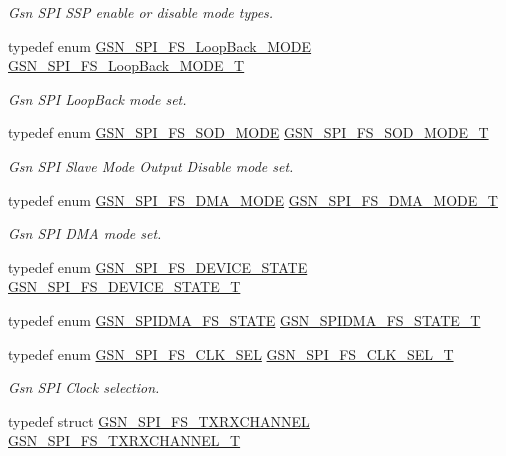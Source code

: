 \begin{DoxyCompactItemize}
\begin{DoxyCompactList}\small\item\em Gsn SPI SSP enable or disable mode types. \end{DoxyCompactList}\item 
typedef enum \hyperlink{a00655_ga082cec3b28f66e93faf6463fa1b76413}{GSN\_\-SPI\_\-FS\_\-LoopBack\_\-MODE} \hyperlink{a00655_ga721139ec14f269f577231293b4b96dad}{GSN\_\-SPI\_\-FS\_\-LoopBack\_\-MODE\_\-T}
\begin{DoxyCompactList}\small\item\em Gsn SPI LoopBack mode set. \end{DoxyCompactList}\item 
typedef enum \hyperlink{a00655_ga7fdf2844c62b8075aa8d730cc4e17134}{GSN\_\-SPI\_\-FS\_\-SOD\_\-MODE} \hyperlink{a00655_gaa0f62d38ee68880a4e3bb673a05d293d}{GSN\_\-SPI\_\-FS\_\-SOD\_\-MODE\_\-T}
\begin{DoxyCompactList}\small\item\em Gsn SPI Slave Mode Output Disable mode set. \end{DoxyCompactList}\item 
typedef enum \hyperlink{a00655_ga527bb8ce76fef8354e9db5ed16509e26}{GSN\_\-SPI\_\-FS\_\-DMA\_\-MODE} \hyperlink{a00655_ga1348552a2785bfc5647d4b4aa234c64c}{GSN\_\-SPI\_\-FS\_\-DMA\_\-MODE\_\-T}
\begin{DoxyCompactList}\small\item\em Gsn SPI DMA mode set. \end{DoxyCompactList}\item 
typedef enum \hyperlink{a00589_a0e734f119d784afd32b10d30c8cca2f6}{GSN\_\-SPI\_\-FS\_\-DEVICE\_\-STATE} \hyperlink{a00589_af40dc8c688ceb473bbc35eec5c025295}{GSN\_\-SPI\_\-FS\_\-DEVICE\_\-STATE\_\-T}
\item 
typedef enum \hyperlink{a00589_a7973ccf42e6a96d49b30b0b901842bb4}{GSN\_\-SPIDMA\_\-FS\_\-STATE} \hyperlink{a00589_a48558d62f89ae3d03b1692979f55da06}{GSN\_\-SPIDMA\_\-FS\_\-STATE\_\-T}
\item 
typedef enum \hyperlink{a00655_ga19874fb33d92ef82cb6a517ba6c1a5fa}{GSN\_\-SPI\_\-FS\_\-CLK\_\-SEL} \hyperlink{a00655_ga0d31f3f2784c160b1ad748b232f4ae7b}{GSN\_\-SPI\_\-FS\_\-CLK\_\-SEL\_\-T}
\begin{DoxyCompactList}\small\item\em Gsn SPI Clock selection. \end{DoxyCompactList}\item 
typedef struct \hyperlink{a00237}{GSN\_\-SPI\_\-FS\_\-TXRXCHANNEL} \hyperlink{a00655_ga8c9aa14f3eb304db286ecd04e0020447}{GSN\_\-SPI\_\-FS\_\-TXRXCHANNEL\_\-T}

\end{DoxyCompactItemize}

